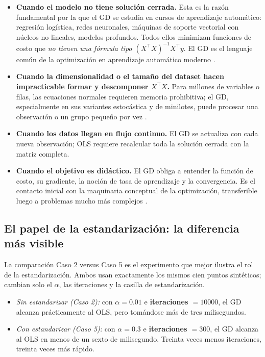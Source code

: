 \documentclass[11pt,a4paper]{article}
\begin{document}
\begin{itemize}
    \item \textbf{Cuando el modelo no tiene solución cerrada.} Esta es la razón fundamental por la que el GD se estudia en cursos de aprendizaje automático: regresión logística, redes neuronales, máquinas de soporte vectorial con núcleos no lineales, modelos profundos. Todos ellos minimizan funciones de costo que \textit{no tienen una fórmula tipo $(X^{\top}X)^{-1} X^{\top} y$}. El GD es el lenguaje común de la optimización en aprendizaje automático moderno \cite{ibm_gd,google_norm}.
    \item \textbf{Cuando la dimensionalidad o el tamaño del dataset hacen impracticable formar y descomponer $X^{\top}X$.} Para millones de variables o filas, las ecuaciones normales requieren memoria prohibitiva; el GD, especialmente en sus variantes estocástica y de minilotes, puede procesar una observación o un grupo pequeño por vez \cite{datacamp_glm}.
    \item \textbf{Cuando los datos llegan en flujo continuo.} El GD se actualiza con cada nueva observación; OLS requiere recalcular toda la solución cerrada con la matriz completa.
    \item \textbf{Cuando el objetivo es didáctico.} El GD obliga a entender la función de costo, su gradiente, la noción de tasa de aprendizaje y la convergencia. Es el contacto inicial con la maquinaria conceptual de la optimización, transferible luego a problemas mucho más complejos \cite{codificando_lineal,keepcoding_gd}.
\end{itemize}

\subsection{El papel de la estandarización: la diferencia más visible}

La comparación Caso 2 versus Caso 5 es el experimento que mejor ilustra el rol de la estandarización. Ambos usan exactamente los mismos cien puntos sintéticos; cambian solo el $\alpha$, las iteraciones y la casilla de estandarización.

\begin{itemize}
    \item \textit{Sin estandarizar (Caso 2):} con $\alpha = 0.01$ e \textbf{iteraciones $= 10000$}, el GD alcanza prácticamente al OLS, pero tomándose más de tres milisegundos.
    \item \textit{Con estandarizar (Caso 5):} con $\alpha = 0.3$ e \textbf{iteraciones $= 300$}, el GD alcanza al OLS en menos de un sexto de milisegundo. Treinta veces menos iteraciones, treinta veces más rápido.
\end{itemize}
\end{document}
